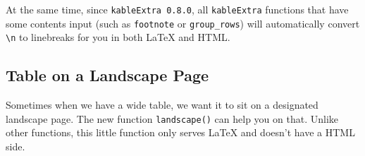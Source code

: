 \documentclass[table]{article}
\newenvironment{Shaded}{\begin{snugshade}}{\end{snugshade}}
\newcommand{\DataTypeTok}[1]{\textcolor[rgb]{0.13,0.29,0.53}{#1}}
\newcommand{\DecValTok}[1]{\textcolor[rgb]{0.00,0.00,0.81}{#1}}
\newcommand{\KeywordTok}[1]{\textcolor[rgb]{0.13,0.29,0.53}{\textbf{#1}}}
\newcommand{\NormalTok}[1]{#1}
\newcommand{\OperatorTok}[1]{\textcolor[rgb]{0.81,0.36,0.00}{\textbf{#1}}}
\newcommand{\StringTok}[1]{\textcolor[rgb]{0.31,0.60,0.02}{#1}}
\begin{document}
At the same time, since \texttt{kableExtra\ 0.8.0}, all
\texttt{kableExtra} functions that have some contents input (such as
\texttt{footnote} or \texttt{group\_rows}) will automatically convert
\texttt{\textbackslash{}n} to linebreaks for you in both LaTeX and HTML.

\hypertarget{table-on-a-landscape-page}{%
\subsection{Table on a Landscape Page}\label{table-on-a-landscape-page}}

Sometimes when we have a wide table, we want it to sit on a designated
landscape page. The new function \texttt{landscape()} can help you on
that. Unlike other functions, this little function only serves LaTeX and
doesn't have a HTML side.

\begin{Shaded}
\end{Shaded}
\end{document}
